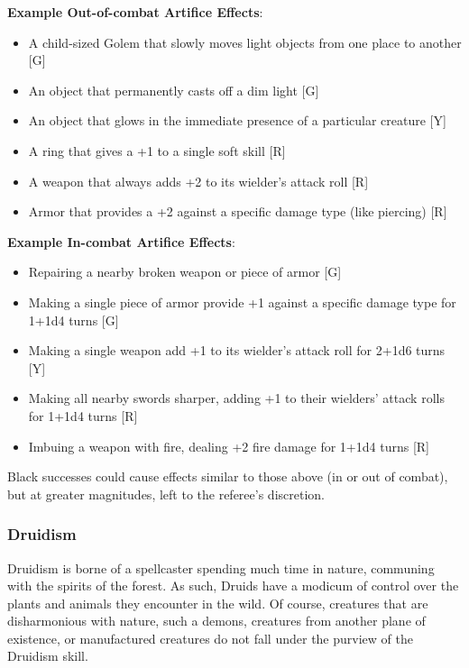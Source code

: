 \documentclass[oneside]{book}
\begin{document}
\begin{multicols}{2}
\textbf{Example Out-of-combat Artifice Effects}: 
	\begin{itemize}
		\setlength{\itemsep}{0cm}%
  		\setlength{\parskip}{0cm}%
		\item{ \small A child-sized Golem that slowly moves light objects from one place to another [G]}
		\item{ \small An object that permanently casts off a dim light [G]}
		\item{ \small An object that glows in the immediate presence of a particular creature [Y]}
		\item{ \small A ring that gives a +1 to a single soft skill [R]}
		\item{ \small A weapon that always adds +2 to its wielder's attack roll [R]}
		\item{ \small Armor that provides a +2 against a specific damage type (like piercing) [R]}
	\end{itemize}

\textbf{Example In-combat Artifice Effects}: 
	\begin{itemize}
		\setlength{\itemsep}{0cm}%
  		\setlength{\parskip}{0cm}%
  		\item{ \small Repairing a nearby broken weapon or piece of armor [G]}
  		\item{ \small Making a single piece of armor provide +1 against a specific damage type for 1+1d4 turns [G]}
  		\item{ \small Making a single weapon add +1 to its wielder's attack roll for 2+1d6 turns [Y]}
  		\item{ \small Making all nearby swords sharper, adding +1 to their wielders' attack rolls for 1+1d4 turns [R]}
  		\item{ \small Imbuing a weapon with fire, dealing +2 fire damage for 1+1d4 turns [R]}
	\end{itemize}
Black successes could cause effects similar to those above (in or out of combat), but at greater magnitudes, left to the referee's discretion.

\subsubsection{Druidism}
Druidism is borne of a spellcaster spending much time in nature, communing with the spirits of the forest. As such, Druids have a modicum of control over the plants and animals they encounter in the wild. Of course, creatures that are disharmonious with nature, such a demons, creatures from another plane of existence, or manufactured creatures do not fall under the purview of the Druidism skill.


\end{multicols}
\end{document}
